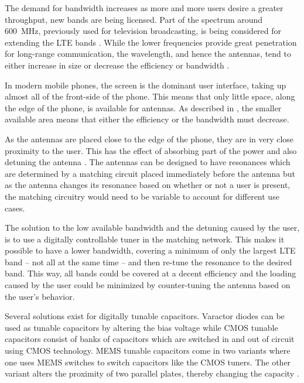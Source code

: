 The demand for bandwidth increases as more and more users desire a greater throughput, new bands are being licensed. Part of the spectrum around \SI{600}{MHz}, previously used for television broadcasting, is being considered for extending the LTE bands \cite{Samantha2015tunableAntennas}. While the lower frequencies provide great penetration for long-range communication, the wavelength, and hence the antennas, tend to either increase in size or decrease the efficiency or bandwidth \cite{hilbert2015tradeoff}. 

In modern mobile phones, the screen is the dominant user interface, taking up almost all of the front-side of the phone. This means that only little space, along the edge of the phone, is available for antennas. As described in \cite{hilbert2015tradeoff}, the smaller available area means that either the efficiency or the bandwidth must decrease.

As the antennas are placed close to the edge of the phone, they are in very close proximity to the user. This has the effect of absorbing part of the power and also detuning the antenna \cite{pelosi2009grip}. The antennas can be designed to have resonances which are determined by a matching circuit placed immediately before the antenna but as the antenna changes its resonance based on whether or not a user is present, the matching circuitry would need to be variable to account for different use cases.

The solution to the low available bandwidth and the detuning caused by the user, is to use a digitally controllable tuner in the matching network. This makes it possible to have a lower bandwidth, covering a minimum of only the largest LTE band -- not all at the same time -- and then re-tune the resonance to the desired band. This way, all bands could be covered at a decent efficiency and the loading caused by the user could be minimized by counter-tuning the antenna based on the user's behavior.

Several solutions exist for digitally tunable capacitors. Varactor diodes can be used as tunable capacitors by altering the bias voltage while CMOS tunable capacitors consist of banks of capacitors which are switched in and out of circuit using CMOS technology. MEMS tunable capacitors come in two variants where one uses MEMS switches to switch capacitors like the CMOS tuners. The other variant alters the proximity of two parallel plates, thereby changing the capacity \cite{gu2014rf}.

